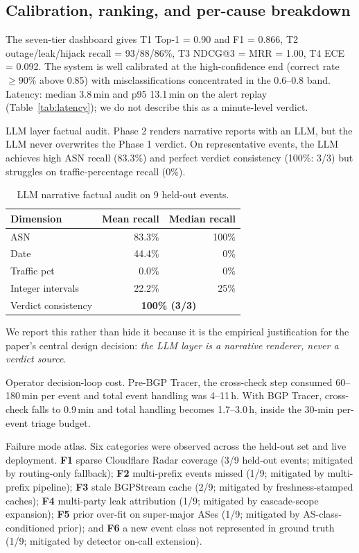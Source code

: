 \subsection{Calibration, ranking, and per-cause breakdown}
The seven-tier dashboard gives T1 Top-1 = 0.90 and F1 = 0.866, T2 outage/leak/hijack recall = 93/88/86\%, T3 NDCG@3 = MRR = 1.00, T4 ECE = 0.092. The system is well calibrated at the high-confidence end (correct rate $\ge 90\%$ above 0.85) with misclassifications concentrated in the $0.6$--$0.8$ band. Latency: median 3.8\,min and p95 13.1\,min on the alert replay (Table~\ref{tab:latency}); we do not describe this as a minute-level verdict.

LLM layer factual audit. Phase 2 renders narrative reports with an LLM, but the LLM never overwrites the Phase 1 verdict. On representative events, the LLM achieves high ASN recall (83.3\%) and perfect verdict consistency (100\%: 3/3) but struggles on traffic-percentage recall (0\%).

\begin{table}[t]
\centering
\caption{LLM narrative factual audit on 9 held-out events.}
\label{tab:llm-audit}
\small
\begin{tabular}{l r r}
\hline
\textbf{Dimension} & \textbf{Mean recall} & \textbf{Median recall} \\
\hline
ASN                & 83.3\% & 100\% \\
Date               & 44.4\% & 0\%   \\
Traffic pct        & 0.0\%  & 0\%   \\
Integer intervals   & 22.2\% & 25\%  \\
\hline
Verdict consistency & \multicolumn{2}{c}{\textbf{100\% (3/3)}} \\
\hline
\end{tabular}
\end{table}

We report this rather than hide it because it is the empirical justification for the paper's central design decision: \emph{the LLM layer is a narrative renderer, never a verdict source}.

Operator decision-loop cost. Pre-BGP Tracer, the cross-check step consumed 60--180\,min per event and total event handling was 4--11\,h. With BGP Tracer, cross-check falls to 0.9\,min and total handling becomes 1.7--3.0\,h, inside the 30-min per-event triage budget.

Failure mode atlas. Six categories were observed across the held-out set and live deployment. \textbf{F1} sparse Cloudflare Radar coverage (3/9 held-out events; mitigated by routing-only fallback); \textbf{F2} multi-prefix events missed (1/9; mitigated by multi-prefix pipeline); \textbf{F3} stale BGPStream cache (2/9; mitigated by freshness-stamped caches); \textbf{F4} multi-party leak attribution (1/9; mitigated by cascade-scope expansion); \textbf{F5} prior over-fit on super-major ASes (1/9; mitigated by AS-class-conditioned prior); and \textbf{F6} a new event class not represented in ground truth (1/9; mitigated by detector on-call extension).

